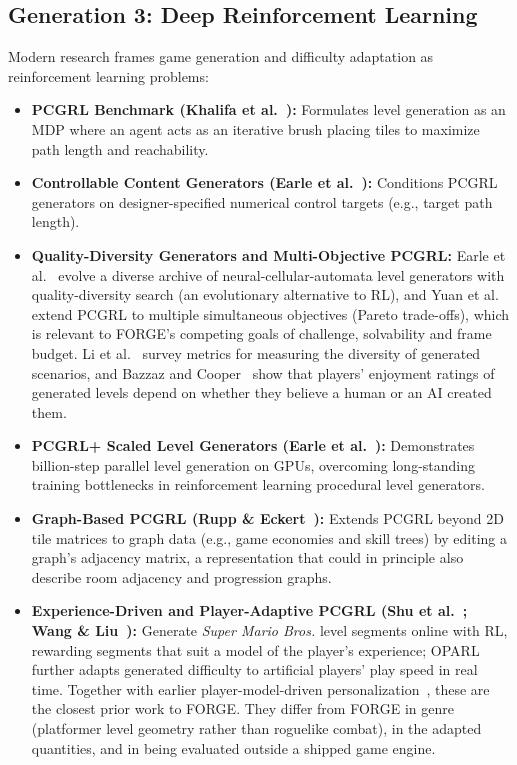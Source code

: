 \subsection{Generation 3: Deep Reinforcement Learning}
Modern research frames game generation and difficulty adaptation as reinforcement learning problems:
\begin{itemize}
    \item \textbf{PCGRL Benchmark (Khalifa et al.~\cite{khalifa2020pcgrl}):} Formulates level generation as an MDP where an agent acts as an iterative brush placing tiles to maximize path length and reachability.
    \item \textbf{Controllable Content Generators (Earle et al.~\cite{earle2021controllable}):} Conditions PCGRL generators on designer-specified numerical control targets (e.g., target path length).
    \item \textbf{Quality-Diversity Generators and Multi-Objective PCGRL:} Earle et al.~\cite{earle2021illuminating} evolve a diverse archive of neural-cellular-automata level generators with quality-diversity search (an evolutionary alternative to RL), and Yuan et al.~\cite{yuan2026mopcgrl} extend PCGRL to multiple simultaneous objectives (Pareto trade-offs), which is relevant to FORGE's competing goals of challenge, solvability and frame budget. Li et al.~\cite{li2025measuring} survey metrics for measuring the diversity of generated scenarios, and Bazzaz and Cooper~\cite{bazzaz2026imitation} show that players' enjoyment ratings of generated levels depend on whether they believe a human or an AI created them.
    \item \textbf{PCGRL+ Scaled Level Generators (Earle et al.~\cite{earle2024pcgrlplus}):} Demonstrates billion-step parallel level generation on GPUs, overcoming long-standing training bottlenecks in reinforcement learning procedural level generators.
    \item \textbf{Graph-Based PCGRL (Rupp \& Eckert~\cite{rupp2024gpcgrl}):} Extends PCGRL beyond 2D tile matrices to graph data (e.g., game economies and skill trees) by editing a graph's adjacency matrix, a representation that could in principle also describe room adjacency and progression graphs.
    \item \textbf{Experience-Driven and Player-Adaptive PCGRL (Shu et al.~\cite{shu2021edrl}; Wang \& Liu~\cite{wang2022oparl}):} Generate \textit{Super Mario Bros.} level segments online with RL, rewarding segments that suit a model of the player's experience; OPARL further adapts generated difficulty to artificial players' play speed in real time. Together with earlier player-model-driven personalization~\cite{shaker2010personalized}, these are the closest prior work to FORGE. They differ from FORGE in genre (platformer level geometry rather than roguelike combat), in the adapted quantities, and in being evaluated outside a shipped game engine.

\end{itemize}
